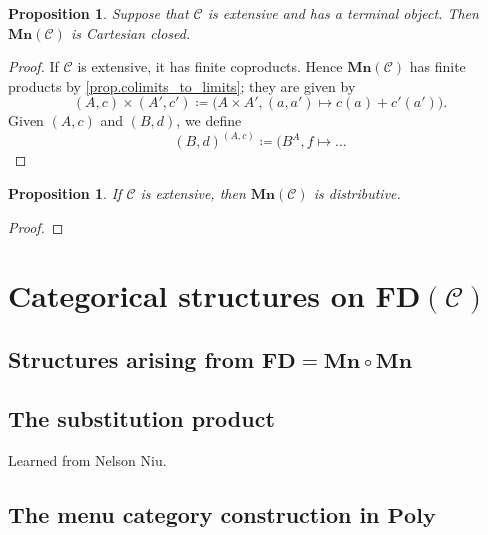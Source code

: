 \documentclass[11pt, one side, article]{memoir}
\theoremstyle{definition}
\theoremstyle{plain}
\newtheorem{proposition}[definitionx]{Proposition}
\newcommand{\cat}[1]{\mathcal{#1}}%
\newcommand{\Cat}[1]{\mathbf{#1}}%
\newcommand{\poly}{\Cat{Poly}}
\newcommand{\0}{\Cat{0}}
\newcommand{\1}{\Cat{1}}
\newcommand{\fd}{\Cat{FD}}
\newcommand{\mn}{\Cat{Mn}}
\begin{document}
\begin{proposition}
Suppose that $\cat{C}$ is extensive and has a terminal object. Then $\mn(\cat{C})$ is Cartesian closed.
\end{proposition}
\begin{proof}
If $\cat{C}$ is extensive, it has finite coproducts. Hence $\mn(\cat{C})$ has finite products by \cref{prop.colimits_to_limits}; they are given by
\[
(A,c)\times (A',c')\coloneqq\big(A\times A', (a,a')\mapsto c(a)+c'(a')\big).
\]
Given $(A,c)$ and $(B,d)$, we define
\[
(B,d)^{(A,c)}\coloneqq(B^A, f\mapsto ...
\]
\end{proof}

\begin{proposition}
If $\cat{C}$ is extensive, then $\mn(\cat{C})$ is distributive.
\end{proposition}
\begin{proof}

\end{proof}

\chapter{Categorical structures on $\fd(\cat{C})$}
\section{Structures arising from $\fd=\mn\circ\mn$}
\section{The substitution product}

Learned from Nelson Niu.

\section{The menu category construction in $\poly$}


\printbibliography
\end{document}
